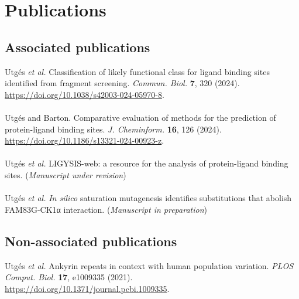 \chapter*{Publications}

\section*{Associated publications}

Utgés \textit{et al.} Classification of likely functional class for ligand binding sites identified from fragment screening. \textit{Commun. Biol.} \textbf{7}, 320 (2024). \url{https://doi.org/10.1038/s42003-024-05970-8}.
\\\\ 
\noindent
Utgés and Barton. Comparative evaluation of methods for the prediction of protein-ligand binding sites. \textit{J. Cheminform.} \textbf{16}, 126 (2024). \url{https://doi.org/10.1186/s13321-024-00923-z}.
\\\\ 
\noindent
Utgés \textit{et al.} LIGYSIS-web: a resource for the analysis of protein-ligand binding sites. (\textit{Manuscript under revision})
\\\\ 
\noindent
Utgés \textit{et al.} \textit{In silico} saturation mutagenesis identifies substitutions that abolish FAM83G-CK1α interaction. (\textit{Manuscript in preparation})

\section*{Non-associated publications}

Utgés \textit{et al.} Ankyrin repeats in context with human population variation. \textit{PLOS Comput. Biol.} \textbf{17}, e1009335 (2021). \url{https://doi.org/10.1371/journal.pcbi.1009335}.